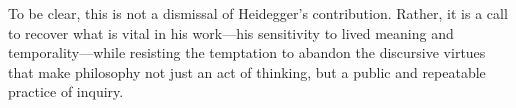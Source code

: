 \documentclass{article}
\begin{document}
To be clear, this is not a dismissal of Heidegger’s contribution. Rather, it is a call to recover what is vital in his work—his sensitivity to lived meaning and temporality—while resisting the temptation to abandon the discursive virtues that make philosophy not just an act of thinking, but a public and repeatable practice of inquiry.

\newpage
\printbibliography
\end{document}
